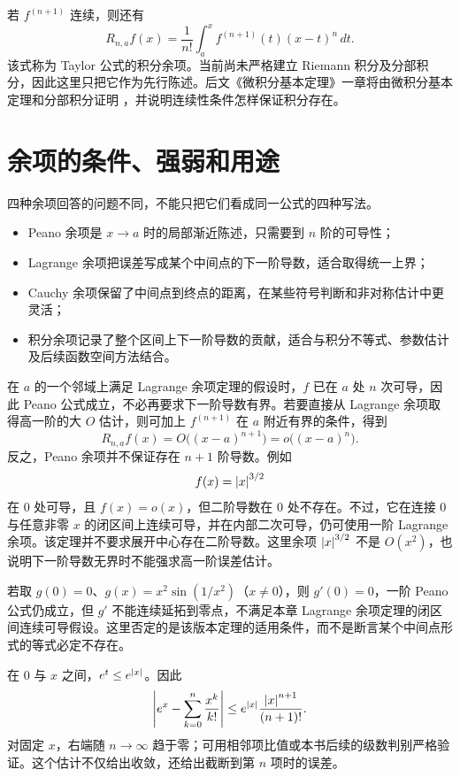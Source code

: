 若 \(f^{(n+1)}\) 连续，则还有
\begin{equation}
 R_{n,a}f(x)
 =\frac1{n!}\int_a^x f^{(n+1)}(t)(x-t)^n\,dt.
 \label{eq:taylor-integral-remainder}
\end{equation}
该式称为 Taylor 公式的积分余项。当前尚未严格建立 Riemann 积分及分部积分，因此这里只把它作为先行陈述。后文《微积分基本定理》一章将由微积分基本定理和分部积分证明 ，并说明连续性条件怎样保证积分存在。

\section{余项的条件、强弱和用途}

四种余项回答的问题不同，不能只把它们看成同一公式的四种写法。

\begin{itemize}
 \item Peano 余项是 \(x\to a\) 时的局部渐近陈述，只需要到 \(n\) 阶的可导性；
 \item Lagrange 余项把误差写成某个中间点的下一阶导数，适合取得统一上界；
 \item Cauchy 余项保留了中间点到终点的距离，在某些符号判断和非对称估计中更灵活；
 \item 积分余项记录了整个区间上下一阶导数的贡献，适合与积分不等式、参数估计及后续函数空间方法结合。
\end{itemize}

在 \(a\) 的一个邻域上满足 Lagrange 余项定理的假设时，\(f\) 已在 \(a\) 处 \(n\) 次可导，因此 Peano 公式成立，不必再要求下一阶导数有界。若要直接从 Lagrange 余项取得高一阶的大 \(O\) 估计，则可加上 \(f^{(n+1)}\) 在 \(a\) 附近有界的条件，得到
\[
 R_{n,a}f(x)=O\bigl((x-a)^{n+1}\bigr)
              =o\bigl((x-a)^n\bigr).
\]
反之，Peano 余项并不保证存在 \(n+1\) 阶导数。例如
\[
 f(x)=\left|x\right|^{3/2}
\]
在 \(0\) 处可导，且 \(f(x)=o(x)\)，但二阶导数在 \(0\) 处不存在。不过，它在连接 \(0\) 与任意非零 \(x\) 的闭区间上连续可导，并在内部二次可导，仍可使用一阶 Lagrange 余项。该定理并不要求展开中心存在二阶导数。这里余项 \(\left|x\right|^{3/2}\) 不是 \(O(x^2)\)，也说明下一阶导数无界时不能强求高一阶误差估计。

若取 \(g(0)=0\)、\(g(x)=x^2\sin(1/x^2)\)（\(x\ne0\)），则 \(g'(0)=0\)，一阶 Peano 公式仍成立，但 \(g'\) 不能连续延拓到零点，不满足本章 Lagrange 余项定理的闭区间连续可导假设。这里否定的是该版本定理的适用条件，而不是断言某个中间点形式的等式必定不存在。

\begin{example}[指数函数的误差]
在 \(0\) 与 \(x\) 之间，\(e^t\le e^{\left|x\right|}\)。因此
\[
 \left|e^x-\sum_{k=0}^{n}\frac{x^k}{k!}\right|
 \le e^{\left|x\right|}\frac{\left|x\right|^{n+1}}{(n+1)!}.
\]
对固定 \(x\)，右端随 \(n\to\infty\) 趋于零；可用相邻项比值或本书后续的级数判别严格验证。这个估计不仅给出收敛，还给出截断到第 \(n\) 项时的误差。
\end{example}

